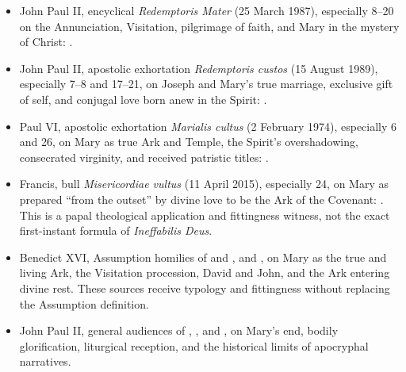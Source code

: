 \begin{itemize}
  \item John Paul II, encyclical \emph{Redemptoris Mater} (25 March 1987), especially 8--20 on the Annunciation, Visitation, pilgrimage of faith, and Mary in the mystery of Christ: .
  \item John Paul II, apostolic exhortation \emph{Redemptoris custos} (15 August 1989), especially 7--8 and 17--21, on Joseph and Mary's true marriage, exclusive gift of self, and conjugal love born anew in the Spirit: .
  \item Paul VI, apostolic exhortation \emph{Marialis cultus} (2 February 1974), especially 6 and 26, on Mary as true Ark and Temple, the Spirit's overshadowing, consecrated virginity, and received patristic titles: .
  \item Francis, bull \emph{Misericordiae vultus} (11 April 2015), especially 24, on Mary as prepared ``from the outset'' by divine love to be the Ark of the Covenant: .  This is a papal theological application and fittingness witness, not the exact first-instant formula of \emph{Ineffabilis Deus}.
  \item Benedict XVI, Assumption homilies of  and , and , on Mary as the true and living Ark, the Visitation procession, David and John, and the Ark entering divine rest.  These sources receive typology and fittingness without replacing the Assumption definition.
  \item John Paul II, general audiences of , , and , on Mary's end, bodily glorification, liturgical reception, and the historical limits of apocryphal narratives.
\end{itemize}

